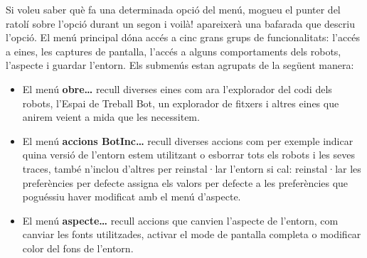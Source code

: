 Si voleu saber què fa una determinada opció del menú, mogueu el punter del ratolí sobre l'opció durant un segon i voilà!  apareixerà una bafarada que descriu l'opció. El menú principal dóna accés a cinc grans grups de funcionalitats: l'accés a eines, les captures de pantalla, l'accés a alguns comportaments dels robots, l'aspecte i guardar l'entorn. Els submenús estan agrupats de la següent manera:   

\begin{itemize}
\item El menú \textbf{obre\dots} recull diverses eines com ara l'explorador del codi dels robots, l'\textsf{Espai de Treball Bot}, un explorador de fitxers i altres eines que anirem veient a mida que les necessitem.
\item El menú \textbf{accions BotInc\dots} recull diverses accions com per exemple indicar quina versió de l'entorn estem utilitzant o esborrar tots els robots i les seves traces, també n'inclou d'altres per reinstal·lar l'entorn si cal: reinstal·lar les preferències per defecte assigna els valors per defecte a les preferències que poguéssiu haver modificat amb el menú d'aspecte.
\item El menú \textbf{aspecte\dots} recull accions que canvien l'aspecte de l'entorn, com canviar les fonts utilitzades, activar el mode de pantalla completa o modificar color del fons de l'entorn.
\end{itemize}

